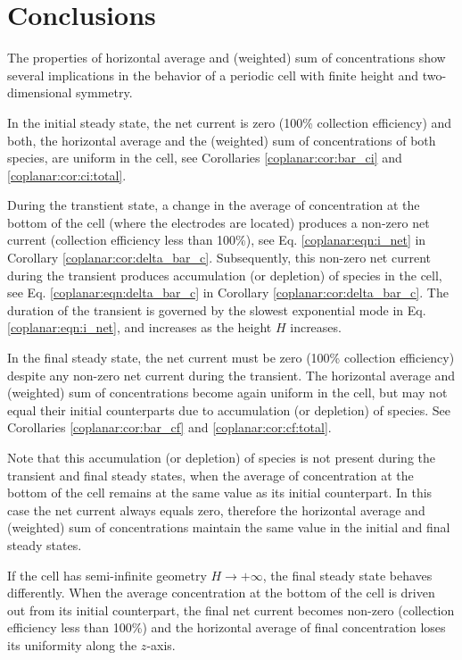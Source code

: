 

\section{Conclusions}

The properties of horizontal average and (weighted) sum of concentrations
show several implications in the behavior of
a periodic cell with finite height and two-dimensional symmetry.

In the initial steady state,
the net current is zero (100\% collection efficiency) and both,
the horizontal average and the (weighted) sum of concentrations of both species,
are uniform in the cell, see Corollaries \ref{coplanar:cor:bar_ci} and \ref{coplanar:cor:ci:total}.

During the transtient state,
a change in the average of concentration at the bottom of the cell
(where the electrodes are located) produces a non-zero net current
(collection efficiency less than 100\%),
see Eq. \eqref{coplanar:eqn:i_net} in Corollary \ref{coplanar:cor:delta_bar_c}.
Subsequently, this non-zero net current during the transient
produces accumulation (or depletion) of species in the cell,
see Eq. \eqref{coplanar:eqn:delta_bar_c}
in Corollary \ref{coplanar:cor:delta_bar_c}.
The duration of the transient is governed by the slowest exponential mode
in Eq. \eqref{coplanar:eqn:i_net}, and increases as the height $H$ increases.

In the final steady state, the net current must be zero 
(100\% collection efficiency)
despite any non-zero net current during the transient.
The horizontal average and (weighted) sum of concentrations
become again uniform in the cell, but may not equal their initial counterparts
due to accumulation (or depletion) of species.
See Corollaries \ref{coplanar:cor:bar_cf} and \ref{coplanar:cor:cf:total}.

Note that this accumulation (or depletion) of species
is not present during the transient and final steady states,
when the average of concentration at the bottom of the cell
remains at the same value as its initial counterpart.
In this case the net current always equals zero,
therefore the horizontal average and (weighted) sum of concentrations
maintain the same value in the initial and final steady states.

If the cell has semi-infinite geometry $H \to +\infty$,
the final steady state behaves differently.
When the average concentration at the bottom of the cell
is driven out from its initial counterpart,
the final net current becomes non-zero (collection efficiency less than 100\%) and the horizontal average of final concentration loses its uniformity along the $z$-axis.

